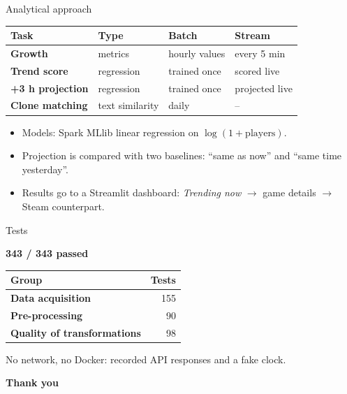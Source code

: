 \documentclass[aspectratio=169,10pt]{beamer}
\begin{document}
\begin{frame}{Analytical approach}
  \centering
  \begin{tabular}{>{\bfseries}l l l l}
    \toprule
    Task & Type & Batch & Stream\\
    \midrule
    Growth & metrics & hourly values & every 5 min\\
    Trend score & regression & trained once & scored live\\
    +3 h projection & regression & trained once & projected live\\
    Clone matching & text similarity & daily & --\\
    \bottomrule
  \end{tabular}

  \vspace{5mm}
  \begin{itemize}
    \item Models: Spark MLlib linear regression on $\log(1+\text{players})$.
    \item Projection is compared with two baselines: ``same as now'' and ``same time yesterday''.
    \item Results go to a Streamlit dashboard: \emph{Trending now} $\rightarrow$ game details $\rightarrow$ Steam counterpart.
  \end{itemize}
\end{frame}

\begin{frame}{Tests}
  \centering
  {\Huge\bfseries\color{kfcteal} 343 / 343 passed\par}
  \vspace{6mm}
  \begin{tabular}{>{\bfseries}l r}
    \toprule
    Group & Tests\\
    \midrule
    Data acquisition & 155\\
    Pre-processing & 90\\
    Quality of transformations & 98\\
    \bottomrule
  \end{tabular}

  \vspace{5mm}
  \small No network, no Docker: recorded API responses and a fake clock.
\end{frame}

\begin{frame}
  \centering
  \vspace{1cm}
  {\Huge\bfseries\color{kfcblue} Thank you\par}
  \vspace{8mm}
\end{frame}
\end{document}
